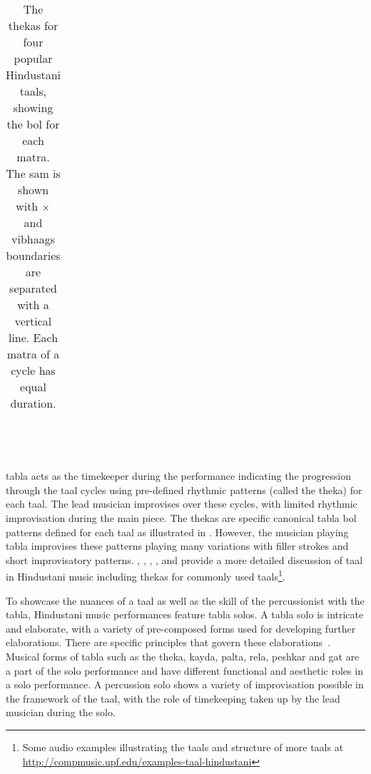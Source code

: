 \begin{table}
{\begin{tabular}{cc|ccc|cc|ccc}
\end{tabular}}\\
%
\\
%
\caption[The \glspl{theka} for popular Hindustani \glspl{taal}]{The \glspl{theka} for four popular Hindustani \glspl{taal}, showing the \gls{bol} for each \gls{matra}. The \gls{sam} is shown with $\protect\times$ and \glspl{vibhaag} boundaries are separated with a vertical line. Each \gls{matra} of a cycle has equal duration.}\label{fig:theka:hindustani}
\end{table}

\Gls{tabla} acts as the timekeeper during the performance indicating the progression through the \gls{taal} cycles using pre-defined rhythmic patterns (called the \gls{theka}) for each \gls{taal}. The lead musician improvises over these cycles, with limited rhythmic improvisation during the main piece. The \glspl{theka} are specific canonical \gls{tabla} \gls{bol} patterns defined for each \gls{taal} as illustrated in . However, the musician playing \gls{tabla} improvises these patterns playing many variations with filler strokes and short improvisatory patterns. , , , , and  provide a more detailed discussion of \gls{taal} in Hindustani music including \glspl{theka} for commonly used \glspl{taal}\footnote{Some audio examples illustrating the \glspl{taal} and structure of more \glspl{taal} at \url{http://compmusic.upf.edu/examples-taal-hindustani}}. 

To showcase the nuances of a \gls{taal} as well as the skill of the percussionist with the \gls{tabla}, Hindustani music performances feature \gls{tabla} solos. A \gls{tabla} solo is intricate and elaborate, with a variety of pre-composed forms used for developing further elaborations. There are specific principles that govern these elaborations~\cite[p.~42]{gottlieb:93:tabla}. Musical forms of \gls{tabla} such as the \gls{theka}, \gls{kayda}, \gls{palta}, \gls{rela}, \gls{peshkar} and \gls{gat} are a part of the solo performance and have different functional and aesthetic roles in a solo performance. A percussion solo shows a variety of improvisation possible in the framework of the \gls{taal}, with the role of timekeeping taken up by the lead musician during the solo. 

